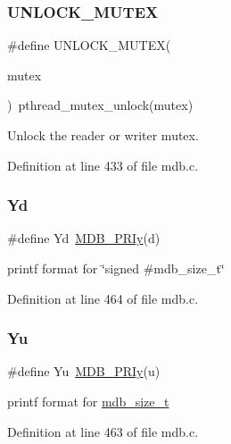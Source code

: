 \subsubsection{\texorpdfstring{U\+N\+L\+O\+C\+K\+\_\+\+M\+U\+T\+EX}{UNLOCK\_MUTEX}}
{\footnotesize\ttfamily \#define U\+N\+L\+O\+C\+K\+\_\+\+M\+U\+T\+EX(\begin{DoxyParamCaption}\item[{}]{mutex }\end{DoxyParamCaption})~pthread\+\_\+mutex\+\_\+unlock(mutex)}

Unlock the reader or writer mutex. 

Definition at line 433 of file mdb.\+c.

\mbox{\label{group__compat_ga0d54d6c0d53bc97f2ee94dd254b9c127}} 
\subsubsection{\texorpdfstring{Yd}{Yd}}
{\footnotesize\ttfamily \#define Yd~\mbox{\hyperlink{lmdb_8h_a11fe126f6ef1f04b1e2ea23c5a433865}{M\+D\+B\+\_\+\+P\+R\+Iy}}(d)}

printf format for \char`\"{}signed \#mdb\+\_\+size\+\_\+t\char`\"{} 

Definition at line 464 of file mdb.\+c.

\mbox{\label{group__compat_ga5737f4364e61e615415bf5b4f01bf14d}} 
\subsubsection{\texorpdfstring{Yu}{Yu}}
{\footnotesize\ttfamily \#define Yu~\mbox{\hyperlink{lmdb_8h_a11fe126f6ef1f04b1e2ea23c5a433865}{M\+D\+B\+\_\+\+P\+R\+Iy}}(u)}

printf format for \mbox{\hyperlink{lmdb_8h_a78821971e612e3898ef4b3ae45ed86f1}{mdb\+\_\+size\+\_\+t}} 

Definition at line 463 of file mdb.\+c.

\mbox{\label{group__compat_ga51591cf51bdd6c1f6015532422e7770e}} 
